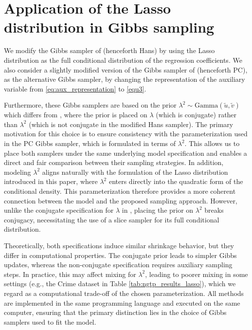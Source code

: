 \section{Application of the Lasso distribution in Gibbs sampling}
\label{Sec:Gibbs}

We modify the Gibbs sampler of \citet{hans2009bayesian} (henceforth Hans) by using the Lasso distribution as the full conditional distribution of the regression coefficients. We also consider a slightly modified version of the Gibbs sampler of \citet{park2008bayesian} (henceforth PC), as the alternative Gibbs sampler, by changing the representation of the auxiliary variable from \eqref{eq:aux_representation} to \eqref{equ3}.


Furthermore, these Gibbs samplers are based on the prior $\lambda^2\sim\mbox{Gamma}(\widetilde{u},\widetilde{v})$ which differs from
\citet{hans2009bayesian}, where the prior is placed on $\lambda$ (which is conjugate) rather than $\lambda^2$ (which is not conjugate in the modified Hans sampler). The primary motivation for this choice is to ensure consistency with the parameterization used in the PC Gibbs sampler, which is formulated in terms of $\lambda^2$. This allows us to place both samplers under the same underlying model specification and enables a direct and fair comparison between their sampling strategies. In addition, modeling $\lambda^2$ aligns naturally with the formulation of the Lasso distribution introduced in this paper, where $\lambda^2$ enters directly into the quadratic form of the conditional density. This parameterization therefore provides a more coherent connection between the model and the proposed sampling approach. However, unlike the conjugate specification for $\lambda$ in \citet{hans2009bayesian}, placing the prior on $\lambda^2$ breaks conjugacy, necessitating the use of a slice sampler \citep{neal2003slice} for its full conditional distribution. 


Theoretically, both specifications induce similar shrinkage behavior, but they differ in computational properties. The conjugate prior leads to simpler Gibbs updates, whereas the non-conjugate specification requires auxiliary sampling steps. In practice, this may affect mixing for $\lambda^2$, leading to poorer mixing in some settings (e.g., the Crime dataset in Table \ref{tab:ngtp_results_lasso}), which we regard as a computational trade-off of the chosen parameterization. All methods are implemented in the same programming language and executed on the same computer, ensuring that the primary distinction lies in the choice of Gibbs samplers used to fit the model.




